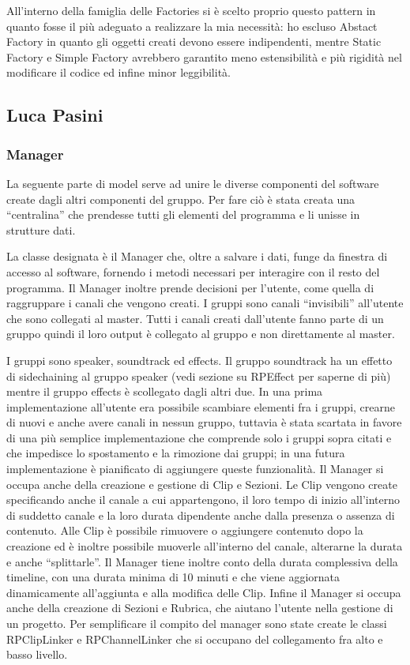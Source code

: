 \documentclass[a4paper,12pt]{report}
\begin{document}
All’interno della famiglia delle Factories si è scelto proprio questo pattern in quanto fosse il più adeguato a realizzare la mia necessità: ho escluso Abstact Factory in quanto gli oggetti creati devono essere indipendenti, mentre Static Factory e Simple Factory avrebbero garantito meno estensibilità e più rigidità nel modificare il codice ed infine minor leggibilità.

\subsection{Luca Pasini}
\subsubsection{Manager}
La seguente parte di model serve ad unire le diverse componenti del software create dagli altri componenti del gruppo. Per fare ciò è stata creata una “centralina” che prendesse tutti gli elementi del programma e li unisse in strutture dati. 

La classe designata è il Manager che, oltre a salvare i dati, funge da finestra di accesso al software, fornendo i metodi necessari per interagire con il resto del programma. Il Manager inoltre prende decisioni per l’utente, come quella di raggruppare i canali che vengono creati. I gruppi sono canali “invisibili” all’utente che sono collegati al master. Tutti i canali creati dall’utente fanno parte di un gruppo quindi il loro output è collegato al gruppo e non direttamente al master.

I gruppi sono speaker, soundtrack ed effects. Il gruppo soundtrack ha un effetto di sidechaining al gruppo speaker (vedi sezione su RPEffect per saperne di più) mentre il gruppo effects è scollegato dagli altri due. In una prima implementazione all’utente era possibile scambiare elementi fra i gruppi, crearne di nuovi e anche avere canali in nessun gruppo, tuttavia è stata scartata in favore di una più semplice implementazione che comprende solo i gruppi sopra citati e che impedisce lo spostamento e la rimozione dai gruppi; in una futura implementazione è pianificato di aggiungere queste funzionalità. Il Manager si occupa anche della creazione e gestione di Clip e Sezioni. Le Clip vengono create specificando anche il canale a cui appartengono, il loro tempo di inizio all’interno di suddetto canale e la loro durata dipendente anche dalla presenza o assenza di contenuto. Alle Clip è possibile rimuovere o aggiungere contenuto dopo la creazione ed è inoltre possibile muoverle all’interno del canale, alterarne la durata e anche “splittarle”. Il Manager tiene inoltre conto della durata complessiva della timeline, con una durata minima di 10 minuti e che viene aggiornata dinamicamente all’aggiunta e alla modifica delle Clip. Infine il Manager si occupa anche della creazione di Sezioni e Rubrica, che aiutano l’utente nella gestione di un progetto. Per semplificare il compito del manager sono state create le classi RPClipLinker e RPChannelLinker che si occupano del collegamento fra alto e basso livello.
\end{document}
